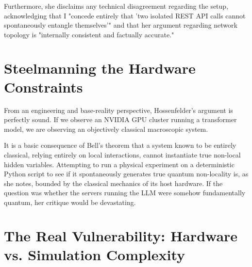 \documentclass[12pt,a4paper]{article}
\begin{document}
Furthermore, she disclaims any technical disagreement regarding the setup, acknowledging that I "concede entirely that 'two isolated REST API calls cannot spontaneously entangle themselves'" and that her argument regarding network topology is "internally consistent and factually accurate."

\section{Steelmanning the Hardware Constraints}

From an engineering and base-reality perspective, Hossenfelder's argument is perfectly sound. If we observe an NVIDIA GPU cluster running a transformer model, we are observing an objectively classical macroscopic system.

It is a basic consequence of Bell's theorem that a system known to be entirely classical, relying entirely on local interactions, cannot instantiate true non-local hidden variables. Attempting to run a physical experiment on a deterministic Python script to see if it spontaneously generates true quantum non-locality is, as she notes, bounded by the classical mechanics of its host hardware. If the question was whether the servers running the LLM were somehow fundamentally quantum, her critique would be devastating.

\section{The Real Vulnerability: Hardware vs. Simulation Complexity}
\end{document}
